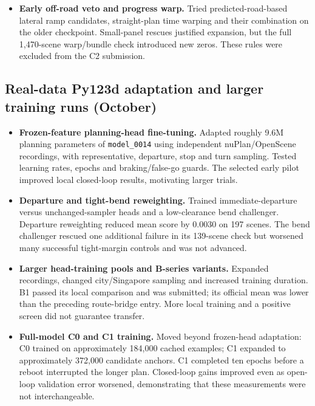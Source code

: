 \begin{itemize}
\item \textbf{Early off-road veto and progress warp.} Tried predicted-road-based lateral ramp candidates, straight-plan time warping and their combination on the older checkpoint. Small-panel rescues justified expansion, but the full 1,470-scene warp/bundle check introduced new zeros. These rules were excluded from the C2 submission.
\end{itemize}

\subsection{Real-data Py123d adaptation and larger training runs (October)}
\begin{itemize}\setlength{\itemsep}{3pt}\setlength{\parsep}{0pt}\setlength{\parskip}{0pt}\setlength{\topsep}{3pt}
\item \textbf{Frozen-feature planning-head fine-tuning.} Adapted roughly 9.6M planning parameters of \texttt{model\_0014} using independent nuPlan/OpenScene recordings, with representative, departure, stop and turn sampling. Tested learning rates, epochs and braking/false-go guards. The selected early pilot improved local closed-loop results, motivating larger trials.
\item \textbf{Departure and tight-bend reweighting.} Trained immediate-departure versus unchanged-sampler heads and a low-clearance bend challenger. Departure reweighting reduced mean score by 0.0030 on 197 scenes. The bend challenger rescued one additional failure in its 139-scene check but worsened many successful tight-margin controls and was not advanced.
\item \textbf{Larger head-training pools and B-series variants.} Expanded recordings, changed city/Singapore sampling and increased training duration. B1 passed its local comparison and was submitted; its official mean was lower than the preceding route-bridge entry. More local training and a positive screen did not guarantee transfer.
\item \textbf{Full-model C0 and C1 training.} Moved beyond frozen-head adaptation: C0 trained on approximately 184,000 cached examples; C1 expanded to approximately 372,000 candidate anchors. C1 completed ten epochs before a reboot interrupted the longer plan. Closed-loop gains improved even as open-loop validation error worsened, demonstrating that these measurements were not interchangeable.

\end{itemize}
